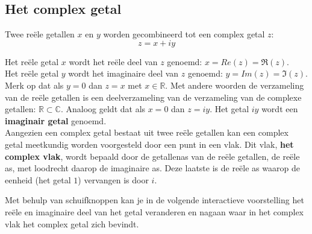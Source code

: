 \subsection{Het complex getal}

\begin{definitie}
Twee re\"{e}le getallen $x$ en $y$ worden gecombineerd tot een complex getal $z$:
\begin{equation*}
z=x+iy
\end{equation*}
\end{definitie}

Het re\"{e}le getal $x$ wordt het re\"{e}le deel van $z$ genoemd: $x=Re(z)=\Re(z)$.\\
Het re\"{e}le getal $y$ wordt het imaginaire deel van $z$ genoemd: $y=Im(z)=\Im(z)$.\\
Merk op dat als $y=0$ dan $z=x$ met $x \in \mathbb{R}$. Met andere woorden de verzameling van de re\"{e}le getallen is een deelverzameling van de verzameling van de complexe getallen: $\mathbb{R} \subset \mathbb{C}$. Analoog geldt dat als $x=0$ dan $z=iy$. Het getal $iy$ wordt een {\bf imaginair getal} genoemd.\\

Aangezien een complex getal bestaat uit twee re\"{e}le getallen kan een complex getal meetkundig worden voorgesteld door een punt in een vlak. Dit vlak, {\bf het complex vlak}, wordt bepaald door de getallenas van de re\"{e}le getallen, de re\"{e}le as, met loodrecht daarop de imaginaire as. Deze laatste is de re\"{e}le as waarop de eenheid (het getal $1$) vervangen is door $i$.  


\begin{figure}[H]
	\centering 
	 
\end{figure}






Met behulp van schuifknoppen kan je in de volgende interactieve voorstelling het re\"{e}le en imaginaire deel van het getal veranderen en nagaan waar in het complex vlak het complex getal zich bevindt.\\


